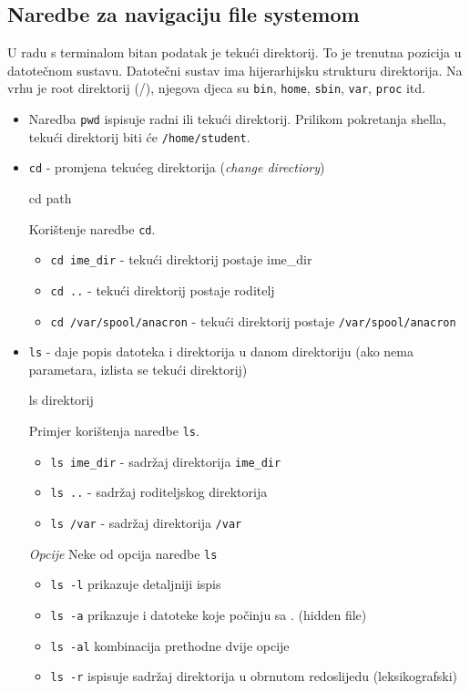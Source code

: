 \subsection*{Naredbe za navigaciju file systemom}
U radu s terminalom bitan podatak je tekući direktorij. To je trenutna pozicija u datotečnom sustavu.
Datotečni sustav ima hijerarhijsku strukturu direktorija. Na vrhu je root direktorij (/), njegova djeca su \texttt{bin}, \texttt{home}, \texttt{sbin}, \texttt{var}, \texttt{proc} itd.
\begin{itemize}
\item Naredba \texttt{pwd} ispisuje radni ili tekući direktorij. Prilikom pokretanja shella, tekući direktorij biti će \texttt{/home/student}.
\item \texttt{cd} - promjena tekućeg direktorija (\textit{change directiory})
\begin{prototip}
cd path
\end{prototip}

\begin{primjer} Korištenje naredbe \texttt{cd}.
\begin{itemize}
\item \texttt{cd ime\_dir} - tekući direktorij postaje ime\_dir
\item \texttt{cd ..} - tekući direktorij postaje roditelj
\item \texttt{cd /var/spool/anacron} - tekući direktorij postaje \texttt{/var/spool/anacron}
\end{itemize}
\end{primjer}

\item \texttt{ls} - daje popis datoteka i direktorija u danom direktoriju (ako nema parametara, izlista se tekući direktorij)
\begin{prototip}
ls direktorij
\end{prototip}
\begin{primjer} Primjer korištenja naredbe \texttt{ls}.
\begin{itemize}
 \item \texttt{ls ime\_dir} - sadržaj direktorija \texttt{ime\_dir}
\item \texttt{ls ..} - sadržaj roditeljskog direktorija
\item \texttt{ls /var} - sadržaj direktorija \texttt{/var}
\end{itemize}
 \textit{Opcije}
\newline Neke od opcija naredbe \texttt{ls}
\begin{itemize}
\item \texttt{ls -l} prikazuje detaljniji ispis
 \item \texttt{ls -a} prikazuje i datoteke koje počinju sa . (hidden file)
\item \texttt{ls -al} kombinacija prethodne dvije opcije
\item \texttt{ls -r} ispisuje sadržaj direktorija u obrnutom redoslijedu (leksikografski)
\end{itemize}
\end{primjer}


\end{itemize}
